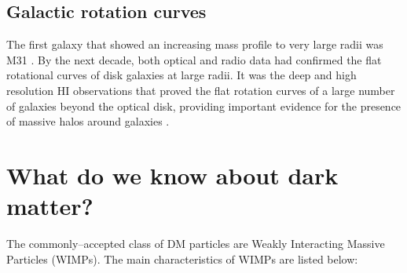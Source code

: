 \documentclass[a4wide,12pt]{book}
\newcommand{\ignore}[1]{}
\begin{document}
\subsection{Galactic rotation curves}
The first galaxy that showed an increasing mass profile to very large radii was M31 \citep[][]{Rubin.Ford1970}. By the next decade, both optical\ignore{ (Rubin+1978, Rubin+1980)} and radio\ignore{ (Bosma 1978)} data had confirmed the flat rotational curves of disk galaxies at large radii. It was the deep and high resolution HI observations that proved the flat rotation curves of a large number of galaxies beyond the optical disk, providing important evidence for the presence of massive halos around galaxies \citep[see e.g.][]{Bosma1981, Begeman1989}. 

\section{What do we know about dark matter?}
\label{subsec:current state}
The commonly--accepted class of DM particles are Weakly Interacting Massive Particles (WIMPs). The main characteristics of WIMPs are listed below:
\end{document}
